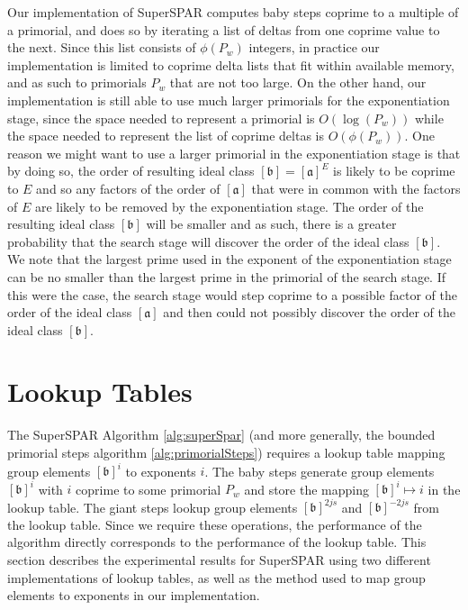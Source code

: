 \documentclass{ucalgthes1}
\theoremstyle{definition}
\newcommand{\ideal}{\mathfrak}
\newcommand{\idealclass}[1]{\left[ \ideal #1 \right]}
\newcommand{\aclass}{\idealclass a}
\newcommand{\bclass}{\idealclass b}
\begin{document}
Our implementation of SuperSPAR computes baby steps coprime to a multiple of a primorial, and does so by iterating a list of deltas from one coprime value to the next.  Since this list consists of $\phi(P_w)$ integers, in practice our implementation is limited to coprime delta lists that fit within available memory, and as such to primorials $P_w$ that are not too large.  On the other hand, our implementation is still able to use much larger primorials for the exponentiation stage, since the space needed to represent a primorial is $O(\log(P_w))$ while the space needed to represent the list of coprime deltas is $O(\phi(P_w))$.  One reason we might want to use a larger primorial in the exponentiation stage is that by doing so, the order of resulting ideal class $\bclass = \aclass^E$ is likely to be coprime to $E$ and so any factors of the order of $\aclass$ that were in common with the factors of $E$ are likely to be removed by the exponentiation stage.  The order of the resulting ideal class $\bclass$ will be smaller and as such, there is a greater probability that the search stage will discover the order of the ideal class $\bclass$.  We note that the largest prime used in the exponent of the exponentiation stage can be no smaller than the largest prime in the primorial of the search stage.  If this were the case, the search stage would step coprime to a possible factor of the order of the ideal class $\aclass$ and then could not possibly discover the order of the ideal class $\bclass$.


\section{Lookup Tables}
\label{sec:ssparHashing}

The SuperSPAR Algorithm \ref{alg:superSpar} (and more generally, the bounded primorial steps algorithm \ref{alg:primorialSteps}) requires a lookup table mapping group elements $\bclass^i$ to exponents $i$.  The baby steps generate group elements $\bclass^i$ with $i$ coprime to some primorial $P_w$ and store the mapping $\bclass^i \mapsto i$ in the lookup table. The giant steps lookup group elements $\bclass^{2js}$ and $\bclass^{-2js}$ from the lookup table.  Since we require these operations, the performance of the algorithm directly corresponds to the performance of the lookup table.  This section describes the experimental results for SuperSPAR using two different implementations of lookup tables, as well as the method used to map group elements to exponents in our implementation.
\end{document}
